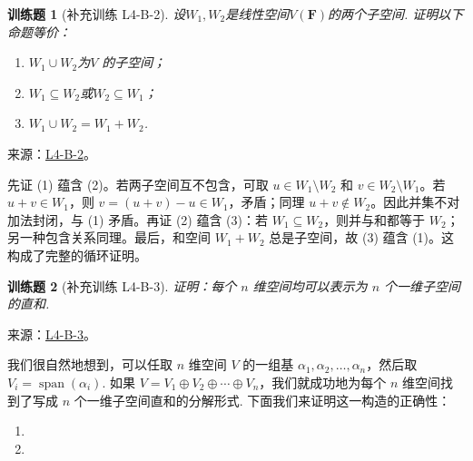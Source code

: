 \documentclass[UTF8,12pt,a4paper,fontset=fandol]{ctexart}
\newtheorem{exercise}{训练题}[section]
\begin{document}
\begin{exercise}[补充训练 L4-B-2]\label{prob:L4-B-2}
设$W_1,W_2$是线性空间$V(\mathbf{F})$的两个子空间. 证明以下命题等价：
        \begin{enumerate}
            \item $W_1 \cup W_2$为$V$ 的子空间；

            \item $W_1 \subseteq W_2$或$W_2 \subseteq W_1$；

            \item $W_1 \cup W_2=W_1+W_2$.
        \end{enumerate}
\end{exercise}
\noindent 来源：\href{https://github.com/yhwu-is/Linear-Algebra-Left-Undone/blob/new/%E8%AE%B2%E4%B9%89/%E4%B8%93%E9%A2%98/4%20%E7%BA%BF%E6%80%A7%E7%A9%BA%E9%97%B4%E7%9A%84%E8%BF%90%E7%AE%97.tex}{L4-B-2}。
\begin{solve}
先证 (1) 蕴含 (2)。若两子空间互不包含，可取 $u\in W_1\setminus W_2$ 和 $v\in W_2\setminus W_1$。若 $u+v\in W_1$，则 $v=(u+v)-u\in W_1$，矛盾；同理 $u+v\notin W_2$。因此并集不对加法封闭，与 (1) 矛盾。再证 (2) 蕴含 (3)：若 $W_1\subseteq W_2$，则并与和都等于 $W_2$；另一种包含关系同理。最后，和空间 $W_1+W_2$ 总是子空间，故 (3) 蕴含 (1)。这构成了完整的循环证明。
\end{solve}

\begin{exercise}[补充训练 L4-B-3]\label{prob:L4-B-3}
证明：每个 $n$ 维空间均可以表示为 $n$ 个一维子空间的直和.
\end{exercise}
\noindent 来源：\href{https://github.com/yhwu-is/Linear-Algebra-Left-Undone/blob/new/%E8%AE%B2%E4%B9%89/%E4%B8%93%E9%A2%98/4%20%E7%BA%BF%E6%80%A7%E7%A9%BA%E9%97%B4%E7%9A%84%E8%BF%90%E7%AE%97.tex}{L4-B-3}。
\begin{solve}
我们很自然地想到，可以任取 $n$ 维空间 $V$ 的一组基 $\alpha_1,\alpha_2,\ldots,\alpha_n$，然后取 $V_i = \operatorname{span}(\alpha_i)$. 如果 $V = V_1 \oplus V_2 \oplus \cdots \oplus V_n$，我们就成功地为每个 $n$ 维空间找到了写成 $n$ 个一维子空间直和的分解形式. 下面我们来证明这一构造的正确性：
            \begin{enumerate}
                \item
                \item
            \end{enumerate}
\end{solve}
\end{document}
